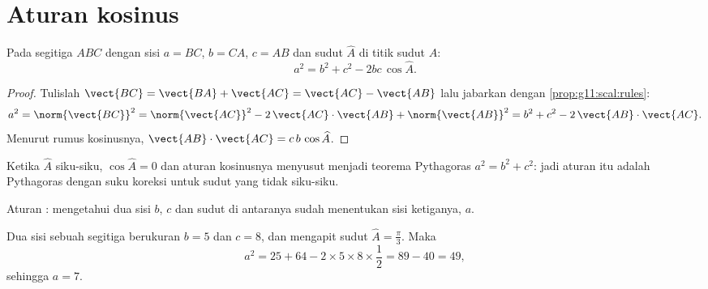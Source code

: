 \section{Aturan kosinus}

\begin{theorem}\label{thm:g11:scal:cosines}
Pada segitiga $ABC$ dengan sisi $a = BC$, $b = CA$, $c = AB$ dan sudut
$\widehat A$ di titik sudut $A$:
\[
a^2 = b^2 + c^2 - 2bc\,\cos\widehat A .
\]
\end{theorem}

\begin{proof}
Tulislah $\vect{BC} = \vect{BA} + \vect{AC} = \vect{AC} - \vect{AB}$ lalu
jabarkan dengan \cref{prop:g11:scal:rules}:
\[
a^2 = \norm{\vect{BC}}^2
= \norm{\vect{AC}}^2 - 2\,\vect{AC}\cdot\vect{AB} + \norm{\vect{AB}}^2
= b^2 + c^2 - 2\,\vect{AB}\cdot\vect{AC}.
\]
Menurut rumus kosinusnya,
$\vect{AB}\cdot\vect{AC} = c\,b\,\cos\widehat A$.
\end{proof}

\begin{remark}
Ketika $\widehat A$ siku-siku, $\cos\widehat A = 0$ dan aturan
kosinusnya menyusut menjadi teorema Pythagoras $a^2 = b^2 + c^2$: jadi aturan
itu adalah Pythagoras dengan suku koreksi untuk sudut yang tidak siku-siku.
\end{remark}

\begin{omfigure}

{\small Aturan : mengetahui dua sisi $b$, $c$ dan sudut di
antaranya sudah menentukan sisi ketiganya, $a$.}
\end{omfigure}

\begin{example}\label{ex:g11:scal:cosines}
Dua sisi sebuah segitiga berukuran $b = 5$ dan $c = 8$, dan mengapit sudut
$\widehat A = \frac\pi3$. Maka
\[
a^2 = 25 + 64 - 2 \times 5 \times 8 \times \frac12 = 89 - 40 = 49,
\]
sehingga $a = 7$.
\end{example}

